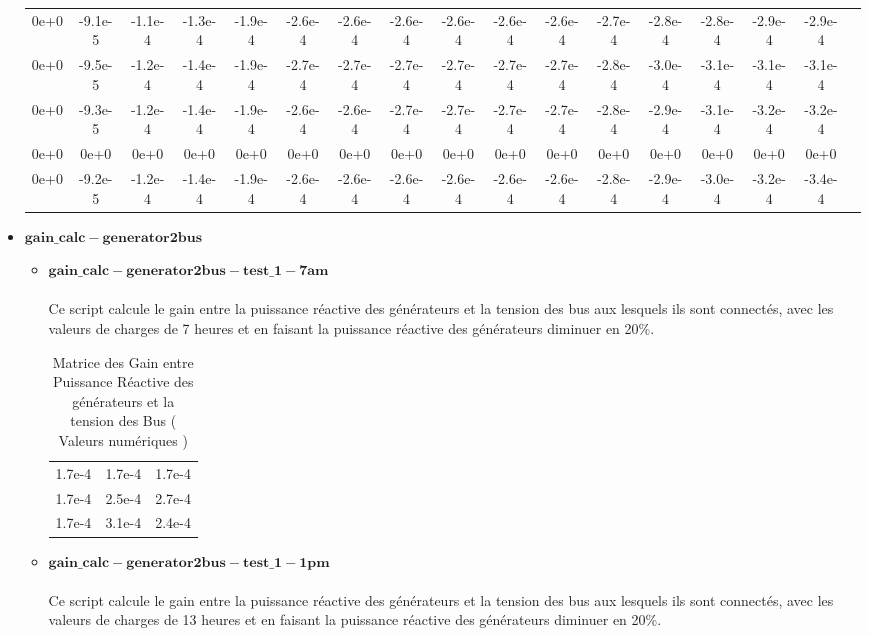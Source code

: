 \begin{itemize}
\begin{table}[H]
{\begin{tabular}{ccccccccccccccccc}
			0e+0& -9.1e-5& -1.1e-4& -1.3e-4& -1.9e-4& -2.6e-4& -2.6e-4& -2.6e-4& -2.6e-4& -2.6e-4& -2.6e-4& -2.7e-4& -2.8e-4& -2.8e-4& -2.9e-4& -2.9e-4\\
			0e+0& -9.5e-5& -1.2e-4& -1.4e-4& -1.9e-4& -2.7e-4& -2.7e-4& -2.7e-4& -2.7e-4& -2.7e-4& -2.7e-4& -2.8e-4& -3.0e-4& -3.1e-4& -3.1e-4& -3.1e-4\\
			0e+0& -9.3e-5& -1.2e-4& -1.4e-4& -1.9e-4& -2.6e-4& -2.6e-4& -2.7e-4& -2.7e-4& -2.7e-4& -2.7e-4& -2.8e-4& -2.9e-4& -3.1e-4& -3.2e-4& -3.2e-4\\
			0e+0& 0e+0& 0e+0& 0e+0& 0e+0& 0e+0& 0e+0& 0e+0& 0e+0& 0e+0& 0e+0& 0e+0& 0e+0& 0e+0& 0e+0& 0e+0\\
			0e+0& -9.2e-5& -1.2e-4& -1.4e-4& -1.9e-4& -2.6e-4& -2.6e-4& -2.6e-4& -2.6e-4& -2.6e-4& -2.6e-4& -2.8e-4& -2.9e-4& -3.0e-4& -3.2e-4& -3.4e-4
			\\
	\end{tabular}}
\end{table} 
\item $\mathbf{gain\_calc-generator2bus}$\\
\begin{itemize}
	
\item $\mathbf{gain\_calc-generator2bus-test\_1-7am}$\\
\\Ce script calcule le gain entre la puissance réactive des générateurs et la tension des bus aux lesquels ils sont connectés, avec les valeurs de charges de 7 heures et en faisant la puissance réactive des générateurs diminuer en 20\%.
\begin{table}[H]
	\captionsetup{justification=centering,margin=2cm}
	\caption{Matrice des Gain entre Puissance Réactive des générateurs et la tension des Bus ( Valeurs numériques )}
	\centering
	\begin{tabular}{ccc}
		1.7e-4&1.7e-4&1.7e-4\\
		1.7e-4&2.5e-4&2.7e-4\\
		1.7e-4&3.1e-4&2.4e-4\\
	\end{tabular}
\end{table}

\item $\mathbf{gain\_calc-generator2bus-test\_1-1pm}$\\
\\
Ce script calcule le gain entre la puissance réactive des générateurs et la tension des bus aux lesquels ils sont connectés, avec les valeurs de charges de 13 heures et en faisant la puissance réactive des générateurs diminuer en 20\%.


\end{itemize}
\end{itemize}
